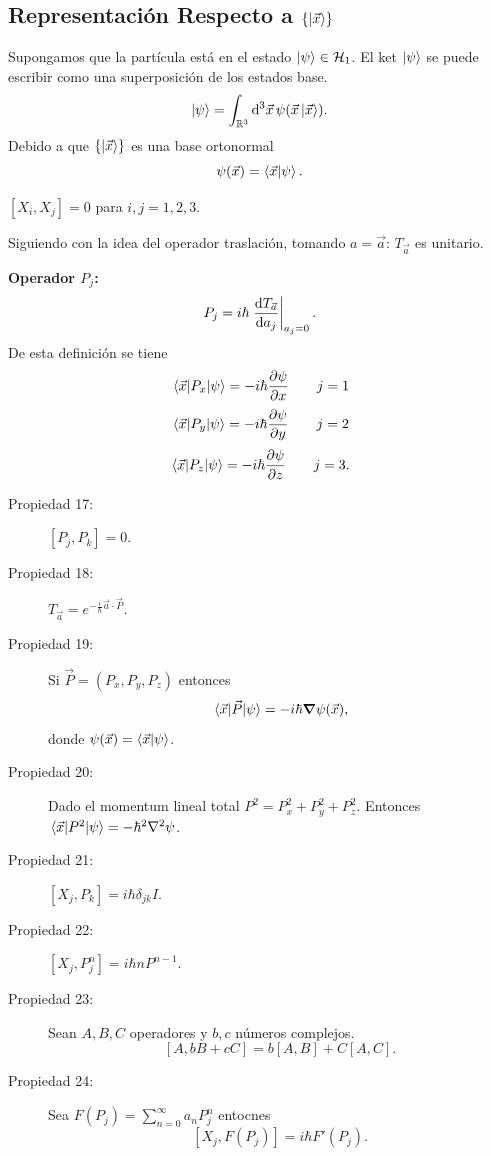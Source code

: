 \subsection{Representación Respecto a $\{ \ket{\vec{x}} \}$}
Supongamos que la partícula está en el estado $\ket{\psi}\in \mathcal{H} _1$. El ket $\ket{\psi}$ se puede escribir como una superposición de los estados base.
    $$ \ket{\psi} = \int _{\mathbb{R} ^3} \dd{^3  \vec{x}} \psi (\vec{x} \ket{\vec{x}}). $$
Debido a que $\{ \ket{\vec{x}} \}$ es una base ortonormal
    $$ \psi (\vec{x}) = \braket{\vec{x}}{\psi}. $$

\begin{description}
    \item[Propiedad 15: ] $[X_i ,X_j] = 0$ para $i,j = 1,2,3$. 
    \item[Propiedad 16: ] Siguiendo con la idea del operador traslación, tomando $a = \vec{a}$: $T_{\vec{a}}$ es unitario.
    \item 
\end{description}


\begin{definition}
    \textbf{Operador $P_j$:} \\
        $$ P_j = i\hbar \eval{\dv{T_{\vec{a}}}{a_j}} _{a_j = 0}. $$
    De esta definición se tiene
        $$ \mel{\vec{x}}{P_x}{\psi} = -i\hbar \pdv{\psi}{x} \qquad j = 1 $$
        $$ \mel{\vec{x}}{P_y}{\psi} = -i\hbar \pdv{\psi}{y} \qquad j = 2 $$
        $$ \mel{\vec{x}}{P_z}{\psi} = -i\hbar \pdv{\psi}{z} \qquad j = 3. $$
\end{definition}


\begin{description}
    \item[Propiedad 17: ] $[P_j,P_k] = 0 $.
    \item[Propiedad 18: ] $T_{\vec{a}} = e^{-\frac{i}{\hbar} \vec{a} \cdot \vec{P}}.$ 
    \item[Propiedad 19: ] Si $\vec{P} = (P_x,P_y,P_z)$ entonces
        $$ \mel{\vec{x}}{\vec{P}}{\psi} = -i\hbar \grad{\psi (\vec{x})}, $$
    donde $\psi (\vec{x}) = \braket{\vec{x}}{\psi}$.
    \item[Propiedad 20: ] Dado el momentum lineal total $P^2 = P_x ^2 + P_y ^2 + P_z ^2$. Entonces $\mel{\vec{x}}{P^2}{\psi} = -\hbar ^2 \laplacian{\psi}$.
    \item[Propiedad 21: ] $[X_j, P_k] = i\hbar \delta _{jk} I$. 
    \item[Propiedad 22: ] $[X_j ,P_j ^n] = i\hbar n P^{n - 1}$.
    \item[Propiedad 23: ] Sean $A,B,C$ operadores y $b,c$ números complejos.
        $$ [A,bB + cC] = b[A,B] + C[A,C]. $$
    \item[Propiedad 24: ] Sea $F(P_j) = \sum _{n=0} ^\infty a_n P_j ^n$ entocnes
        $$ [X_j ,F(P_j)] = i\hbar F' (P_j). $$
\end{description}


